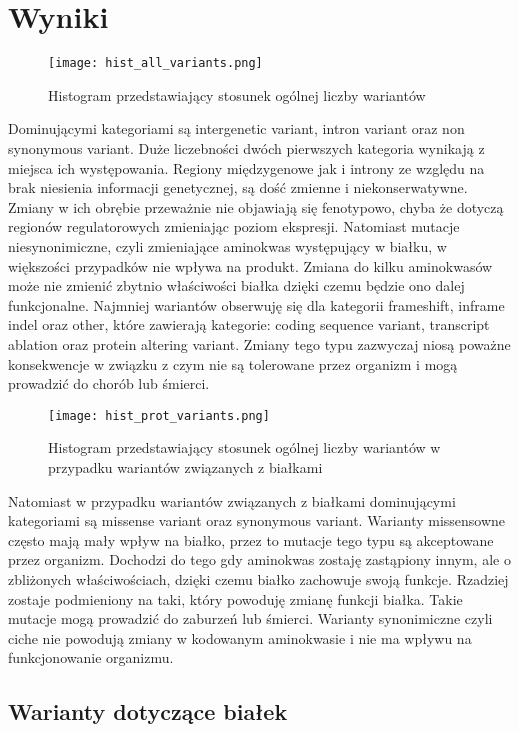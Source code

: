 \documentclass[12pt]{article}
\begin{document}
\section{Wyniki}
\begin{figure}[H]
    \texttt{[image: hist\_all\_variants.png]}
    \caption{Histogram przedstawiający stosunek ogólnej liczby wariantów}
\end{figure}
Dominującymi kategoriami są intergenetic variant, intron variant oraz non synonymous variant. Duże liczebności dwóch pierwszych kategoria wynikają z miejsca ich występowania. Regiony międzygenowe jak i introny ze względu na brak niesienia informacji genetycznej, są dość zmienne i niekonserwatywne. Zmiany w ich obrębie przeważnie nie objawiają się fenotypowo, chyba że dotyczą regionów regulatorowych zmieniając poziom ekspresji. Natomiast mutacje niesynonimiczne, czyli zmieniające aminokwas występujący w białku, w większości przypadków nie wpływa na produkt. Zmiana do kilku aminokwasów może nie zmienić zbytnio właściwości białka dzięki czemu będzie ono dalej funkcjonalne. Najmniej wariantów obserwuję się dla kategorii frameshift, inframe indel oraz other, które zawierają kategorie: coding sequence variant, transcript ablation oraz protein altering variant. Zmiany tego typu zazwyczaj niosą poważne konsekwencje w związku z czym nie są tolerowane przez organizm i mogą prowadzić do chorób lub śmierci. 
\begin{figure}[H]
    \texttt{[image: hist\_prot\_variants.png]}
    \caption{Histogram przedstawiający stosunek ogólnej liczby wariantów w przypadku wariantów związanych z białkami}
\end{figure}

Natomiast w przypadku wariantów związanych z białkami dominującymi kategoriami są missense variant oraz synonymous variant. Warianty missensowne często mają mały wpływ na białko, przez to mutacje tego typu są akceptowane przez organizm. Dochodzi do tego gdy aminokwas zostaję zastąpiony innym, ale o zbliżonych właściwościach, dzięki czemu białko zachowuje swoją funkcje. Rzadziej zostaje podmieniony na taki, który powoduję zmianę funkcji białka. Takie mutacje mogą prowadzić do zaburzeń lub śmierci. Warianty synonimiczne czyli ciche nie powodują zmiany w kodowanym aminokwasie i nie ma wpływu na funkcjonowanie organizmu. 
\subsection{Warianty dotyczące białek}
\end{document}

